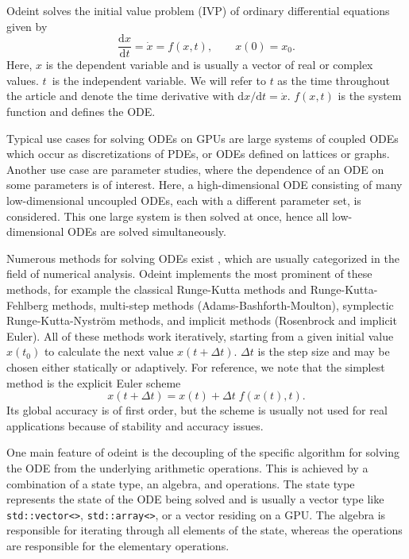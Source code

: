 \documentclass[final]{siamltex}
\newcommand{\code}[1]{\lstinline|#1|}
\newcommand {\de} {\mbox{d}}
\begin{document}
Odeint solves the initial value problem (IVP) of ordinary differential
equations given by
\begin{equation}
\frac{\de x}{\de t } = \dot{x} = f(x , t), \quad \quad x(0) = x_0.
\label{eq:ode}
\end{equation}
Here, $x$ is the dependent variable and is usually a vector of real or complex
values.  $t$~is the independent variable. We will refer to $t$ as the time
throughout the article and denote the time derivative with $\de x / \de t =
\dot{x}$. $f(x,t)$ is the system function and defines the ODE.

Typical use cases for solving ODEs on GPUs are large systems of coupled ODEs
which occur as discretizations of PDEs, or ODEs defined on lattices or
graphs. Another use case are parameter studies, where the
dependence of an ODE on some parameters is of interest. Here, a high-dimensional ODE consisting of many low-dimensional
uncoupled ODEs, each with a different parameter set, is
considered. This one large system is then solved at once, hence all
low-dimensional ODEs are solved simultaneously.



Numerous methods for solving ODEs exist \cite{HairerSolvingODEI,
HairerSolvingODEII,Press-92}, which are usually categorized in the field of numerical
analysis.  Odeint implements the most prominent of these methods, for example
the classical Runge-Kutta methods and Runge-Kutta-Fehlberg methods, multi-step
methods (Adams-Bashforth-Moulton), symplectic Runge-Kutta-Nystr\"om methods,
and implicit methods (Rosenbrock and implicit Euler). All of these methods work
iteratively, starting from a given initial value $x(t_0)$ to calculate the next
value $x(t+\Delta t)$.  $\Delta t$ is the step size and may be chosen either
statically or adaptively.  For reference, we note that the simplest method is
the explicit Euler scheme
\begin{equation}
x\left(t+\Delta t\right) = x(t) + \Delta t \; f(x(t),t) .
\label{eq:euler}
\end{equation}
Its global accuracy is of first order, but the scheme is usually not
used for real applications because of stability and accuracy issues.


One main feature of odeint is the decoupling of the specific algorithm
for solving the ODE from the underlying arithmetic operations. This
is achieved by a combination of a state type, an algebra, and
operations. The state type represents the state of the ODE being
solved and is usually a vector type like \code{std::vector<>},
\code{std::array<>}, or a vector residing on a GPU. The algebra is
responsible for iterating through all elements of the state, whereas
the operations are responsible for the elementary operations.
\end{document}
